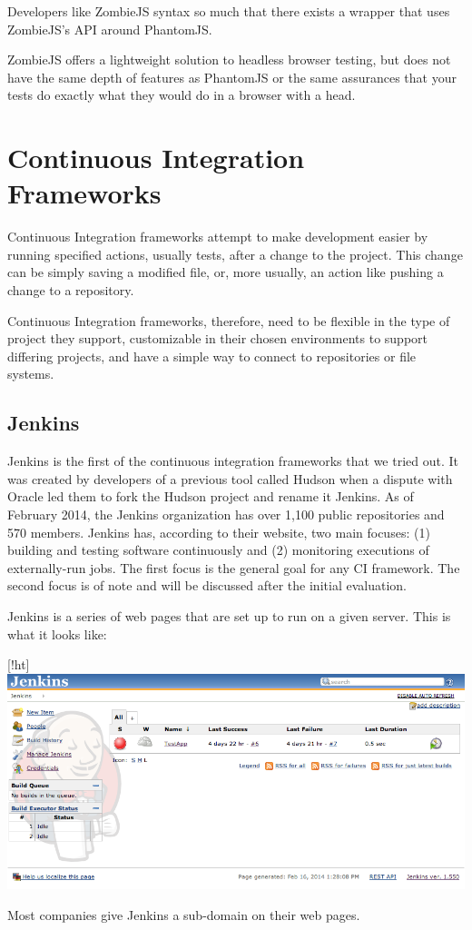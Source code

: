 \documentclass[12pt]{ucthesis}
\newenvironment{Figure}
  {\par\medskip\noindent\minipage{\linewidth}}
  {\endminipage\par\medskip}
\begin{document}
Developers like ZombieJS syntax so much that there exists a wrapper that uses ZombieJS's API around PhantomJS. \cite{ZombiePhantom}

ZombieJS offers a lightweight solution to headless browser testing, but does not have the same depth of features as PhantomJS or the same assurances that your tests do exactly what they would do in a browser with a head.

\section{Continuous Integration Frameworks}
Continuous Integration frameworks attempt to make development easier by running specified actions, usually tests, after a change to the project. This change can be simply saving a modified file, or, more usually, an action like pushing a change to a repository.

Continuous Integration frameworks, therefore, need to be flexible in the type of project they support, customizable in their chosen environments to support differing projects, and have a simple way to connect to repositories or file systems.

\subsection{Jenkins}
Jenkins\cite{Jenkins} is the first of the continuous integration frameworks that we tried out. It was created by developers of a previous tool called Hudson when a dispute with Oracle led them to fork the Hudson project and rename it Jenkins. As of February 2014, the Jenkins organization has over 1,100 public repositories and 570 members. \cite{JenkinsGitHub} Jenkins has, according to their website, two main focuses: (1) building and testing software continuously and (2) monitoring executions of externally-run jobs. The first focus is the general goal for any CI framework. The second focus is of note and will be discussed after the initial evaluation. 

Jenkins is a series of web pages that are set up to run on a given server. This is what it looks like:
\begin{Figure}[!ht]
  \centering
  \includegraphics[width=0.95\linewidth]{jenkins.png}

\end{Figure}
Most companies give Jenkins a sub-domain on their web pages.
\end{document}
